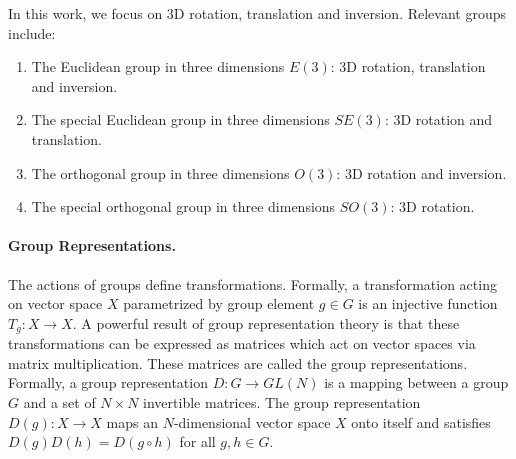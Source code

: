 In this work, we focus on 3D rotation, translation and inversion.
Relevant groups include:
\begin{enumerate}
    \item The Euclidean group in three dimensions $E(3)$: 3D rotation, translation and inversion.
    \item The special Euclidean group in three dimensions $SE(3)$: 3D rotation and translation.
    \item The orthogonal group in three dimensions  $O(3)$: 3D rotation and inversion.
    \item The special orthogonal group in three dimensions  $SO(3)$: 3D rotation.
\end{enumerate}


\paragraph{Group Representations.}
The actions of groups define transformations.
Formally, a transformation acting on vector space $X$ parametrized by group element $g \in G$ is an injective function $T_{g}: X \rightarrow X$.
A powerful result of group representation theory is that these transformations can be expressed as matrices which act on vector spaces via matrix multiplication. 
These matrices are called the group representations.
Formally, a group representation $D: G \rightarrow GL(N)$ is a mapping between a group $G$ and a set of $N \times N$ invertible matrices.
The group representation $D(g): X \rightarrow X$ maps an $N$-dimensional vector space $X$ onto itself and satisfies  $D(g)D(h) = D(g \circ h)$ for all $g, h \in G$.

